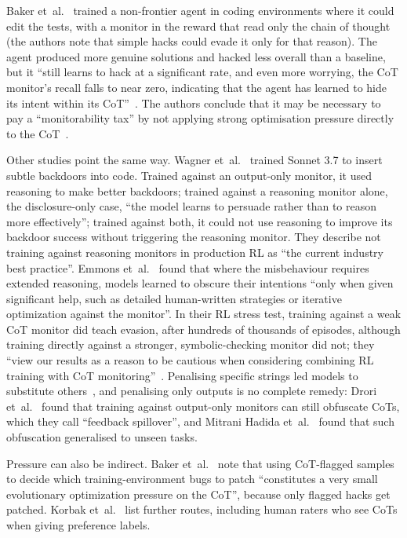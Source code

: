 \documentclass[11pt]{article}
\begin{document}
Baker et~al.~\cite[Sec.~3]{baker2025} trained a non-frontier agent in coding environments where it could edit the tests, with a monitor in the reward that read only the chain of thought (the authors note that simple hacks could evade it only for that reason). The agent produced more genuine solutions and hacked less overall than a baseline, but it ``still learns to hack at a significant rate, and even more worrying, the CoT monitor's recall falls to near zero, indicating that the agent has learned to hide its intent within its CoT''~\cite[Sec.~3.2]{baker2025}. The authors conclude that it may be necessary to pay a ``monitorability tax'' by not applying strong optimisation pressure directly to the CoT~\cite[abstract]{baker2025}.

Other studies point the same way. Wagner et~al.~\cite{wagner2025} trained Sonnet 3.7 to insert subtle backdoors into code. Trained against an output-only monitor, it used reasoning to make better backdoors; trained against a reasoning monitor alone, the disclosure-only case, ``the model learns to persuade rather than to reason more effectively''; trained against both, it could not use reasoning to improve its backdoor success without triggering the reasoning monitor. They describe not training against reasoning monitors in production RL as ``the current industry best practice''. Emmons et~al.~\cite{emmons2025} found that where the misbehaviour requires extended reasoning, models learned to obscure their intentions ``only when given significant help, such as detailed human-written strategies or iterative optimization against the monitor''. In their RL stress test, training against a weak CoT monitor did teach evasion, after hundreds of thousands of episodes, although training directly against a stronger, symbolic-checking monitor did not; they ``view our results as a reason to be cautious when considering combining RL training with CoT monitoring''~\cite[Sec.~7]{emmons2025}. Penalising specific strings led models to substitute others~\cite{skaf2025}, and penalising only outputs is no complete remedy: Drori et~al.~\cite{drori2025} found that training against output-only monitors can still obfuscate CoTs, which they call ``feedback spillover'', and Mitrani Hadida et~al.~\cite{mitranihadida2026} found that such obfuscation generalised to unseen tasks.

Pressure can also be indirect. Baker et~al.~\cite[Sec.~5.2]{baker2025} note that using CoT-flagged samples to decide which training-environment bugs to patch ``constitutes a very small evolutionary optimization pressure on the CoT'', because only flagged hacks get patched. Korbak et~al.~\cite[Sec.~2]{korbak2025} list further routes, including human raters who see CoTs when giving preference labels.
\end{document}
